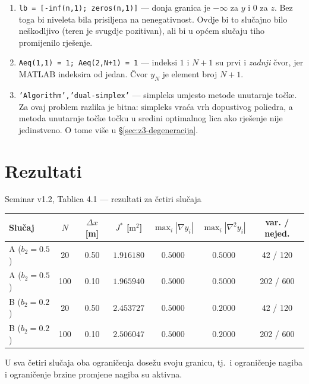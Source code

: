 \begin{korak}
\begin{enumerate}[leftmargin=*]
  \item \texttt{lb = [-inf(n,1); zeros(n,1)]} --- donja granica je $-\infty$ za
        $y$ i $0$ za $z$. Bez toga bi niveleta bila prisiljena na nenegativnost.
        Ovdje bi to slučajno bilo neškodljivo (teren je svugdje pozitivan), ali
        bi u općem slučaju tiho promijenilo rješenje.
  \item \texttt{Aeq(1,1) = 1; Aeq(2,N+1) = 1} --- indeksi $1$ i $N{+}1$ su prvi i
        \emph{zadnji} čvor, jer MATLAB indeksira od jedan. Čvor $y_N$ je element
        broj $N+1$.
  \item \texttt{'Algorithm','dual-simplex'} --- simpleks umjesto metode unutarnje
        točke. Za ovaj problem razlika je bitna: simpleks vraća vrh dopustivog
        poliedra, a metoda unutarnje točke točku u sredini optimalnog lica ako
        rješenje nije jedinstveno. O tome više u \S\ref{sec:z3-degeneracija}.
\end{enumerate}
\end{korak}

\section{Rezultati}
\label{sec:z3-rezultati}

\begin{seminar}{Seminar v1.2, Tablica 4.1 --- rezultati za četiri slučaja}
\begin{center}
\begin{tabular}{lcccccc}
\toprule
\textbf{Slučaj} & $N$ & $\Delta x$ [m] & $J^*$ [$\mathrm{m}^2$] & $\max_i |\nabla y_i|$ & $\max_i |\nabla^2 y_i|$ & \textbf{var. / nejed.} \\
\midrule
A ($b_2 = 0.5$) & 20  & 0.50 & $1.916180$ & $0.5000$ & $0.5000$ & 42 / 120 \\
A ($b_2 = 0.5$) & 100 & 0.10 & $1.965940$ & $0.5000$ & $0.5000$ & 202 / 600 \\
B ($b_2 = 0.2$) & 20  & 0.50 & $2.453727$ & $0.5000$ & $0.2000$ & 42 / 120 \\
B ($b_2 = 0.2$) & 100 & 0.10 & $2.506047$ & $0.5000$ & $0.2000$ & 202 / 600 \\
\bottomrule
\end{tabular}
\end{center}

U sva četiri slučaja oba ograničenja dosežu svoju granicu, tj.\ i ograničenje
nagiba i ograničenje brzine promjene nagiba su aktivna.
\end{seminar}

